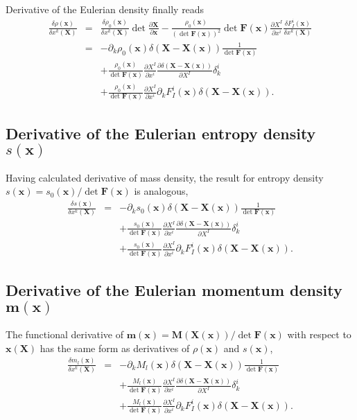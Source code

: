 \documentclass[
10pt, %
a4paper, %
oneside, %
headinclude,footinclude, %
BCOR5mm, %
]{scrartcl}
\newcommand{\xx}{\mathbf{x}}
\newcommand{\XX}{\mathbf{X}}
\newcommand{\mm}{\mathbf{m}}
\newcommand{\MM}{\mathbf{M}}
\newcommand{\FF}{\mathbf{F}}
\begin{document}
Derivative of the Eulerian density finally reads
\begin{eqnarray}
	\frac{\delta \rho(\xx)}{\delta x^k(\XX)}&=&\frac{\delta \rho_0(\xx)}{\delta x^k(\XX)} \det \frac{\partial \XX}{\partial \xx}
	-\frac{\rho_0(\xx)}{(\det \FF(\xx))^2} \det \FF(\xx) \frac{\partial X^I}{\partial x^i} \frac{\delta F^i_I(\xx)}{\delta x^k(\XX)}\nonumber\\
	&=&-\partial_k \rho_0(\xx) \delta(\XX-\XX(\xx))\frac{1}{\det\FF(\xx)}\nonumber\\
	&&
	+\frac{\rho_0(\xx)}{\det \FF(\xx)} \frac{\partial X^I}{\partial x^i} \frac{\partial \delta(\XX-\XX(\xx))}{\partial X^I}\delta^i_k \nonumber\\
	&&+\frac{\rho_0(\xx)}{\det \FF(\xx)} \frac{\partial X^I}{\partial x^i} \partial_k F^i_I(\xx)\delta(\XX-\XX(\xx)).
\end{eqnarray}

\subsection{Derivative of the Eulerian entropy density $s(\xx)$}
Having calculated derivative of mass density, the result for entropy density $s(\xx)=s_0(\xx)/\det\FF(\xx)$  is analogous,
\begin{eqnarray}
	\frac{\delta s(\xx)}{\delta x^k(\XX)}&=&
	-\partial_k s_0(\xx) \delta(\XX-\XX(\xx))\frac{1}{\det\FF(\xx)}\nonumber\\
	&&
	+\frac{s_0(\xx)}{\det \FF(\xx)} \frac{\partial X^I}{\partial x^i} \frac{\partial \delta(\XX-\XX(\xx))}{\partial X^I}\delta^i_k \nonumber\\
	&&+\frac{s_0(\xx)}{\det \FF(\xx)} \frac{\partial X^I}{\partial x^i} \partial_k F^i_I(\xx)\delta(\XX-\XX(\xx)).
\end{eqnarray}

\subsection{Derivative of the Eulerian momentum density $\mm(\xx)$}
The functional derivative of $\mm(\xx)=\MM(\XX(\xx))/\det \FF(\xx)$ with respect to $\xx(\XX)$ has the same form as derivatives of $\rho(\xx)$ and $s(\xx)$,
\begin{eqnarray}
	\frac{\delta m_l(\xx)}{\delta x^k(\XX)}&=&
	-\partial_k M_l(\xx) \delta(\XX-\XX(\xx))\frac{1}{\det\FF(\xx)}\nonumber\\
	&&
	+\frac{M_l(\xx)}{\det \FF(\xx)} \frac{\partial X^I}{\partial x^i} \frac{\partial \delta(\XX-\XX(\xx))}{\partial X^I}\delta^i_k \nonumber\\
	&&+\frac{M_l(\xx)}{\det \FF(\xx)} \frac{\partial X^I}{\partial x^i} \partial_k F^i_I(\xx)\delta(\XX-\XX(\xx)).
\end{eqnarray}
\end{document}
